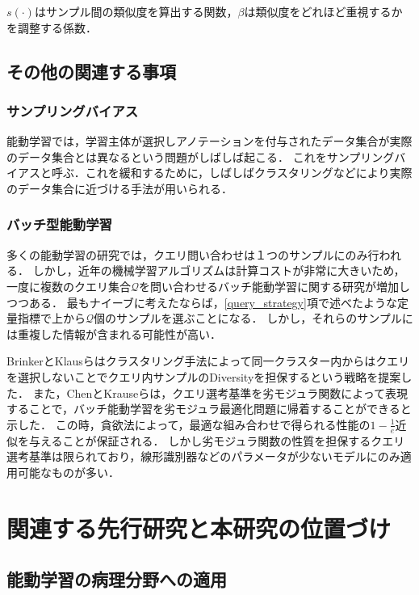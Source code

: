 $s(\cdot)$はサンプル間の類似度を算出する関数，$\beta$は類似度をどれほど重視するかを調整する係数．

\subsection{その他の関連する事項}
\subsubsection{サンプリングバイアス}
能動学習では，学習主体が選択しアノテーションを付与されたデータ集合が実際のデータ集合とは異なるという問題がしばしば起こる．
これをサンプリングバイアスと呼ぶ．これを緩和するために，しばしばクラスタリングなどにより実際のデータ集合に近づける手法が用いられる．

\subsubsection{バッチ型能動学習}
多くの能動学習の研究では，クエリ問い合わせは１つのサンプルにのみ行われる．
しかし，近年の機械学習アルゴリズムは計算コストが非常に大きいため，一度に複数のクエリ集合$\mathcal{Q}$を問い合わせるバッチ能動学習に関する研究が増加しつつある．
最もナイーブに考えたならば，\ref{query_strategy}項で述べたような定量指標で上から$\mathcal{Q}$個のサンプルを選ぶことになる．
しかし，それらのサンプルには重複した情報が含まれる可能性が高い．

BrinkerとKlausらはクラスタリング手法によって同一クラスター内からはクエリを選択しないことでクエリ内サンプルのDiversityを担保するという戦略を提案した\cite{brinker2003incorporating}．
また，ChenとKrauseらは，クエリ選考基準を劣モジュラ関数によって表現することで，バッチ能動学習を劣モジュラ最適化問題に帰着することができると示した\cite{chen2013near}．
この時，貪欲法によって，最適な組み合わせで得られる性能の$1 - \frac{1}{e}$近似を与えることが保証される．
しかし劣モジュラ関数の性質を担保するクエリ選考基準は限られており，線形識別器などのパラメータが少ないモデルにのみ適用可能なものが多い．

\section{関連する先行研究と本研究の位置づけ}

\subsection{能動学習の病理分野への適用}

